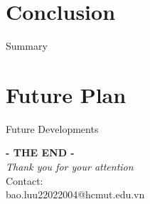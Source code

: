 \documentclass[aspectratio=169]{beamer}
\begin{document}
\section{Conclusion}
\begin{frame}{Summary}

\end{frame}


\section{Future Plan}
\begin{frame}{Future Developments}

\end{frame}


\begin{frame}
    \centering
    \vspace{1cm}
    \textbf{\Huge{- THE END - }}\\
    \vspace{0.2cm}
    \textit{\Large{Thank you for your attention}}\\
    \vspace{15pt}
    \vspace{20pt}
    Contact:\\
    bao.luu22022004@hcmut.edu.vn
\end{frame}

%         
\end{document}
